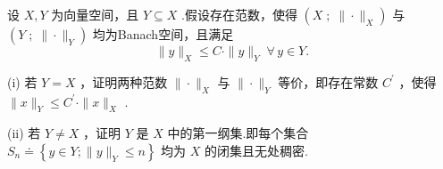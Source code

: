 \begin{rbhw}
设 $X,Y$ 为向量空间，且 $Y \subseteq  X$ .假设存在范数，使得 $\left( {X\;;\;\|  \cdot  {\| }_{X}}\right)$ 与 $\left( {Y\;;\;\|  \cdot  {\| }_{Y}}\right)$ 均为Banach空间，且满足
\[
\| y{\| }_{X} \leq  C \cdot  \| y{\| }_{Y}\;\forall\,y \in  Y.
\]

(i) 若 $Y = X$ ，证明两种范数 $\|  \cdot  {\| }_{X}$ 与 $\|  \cdot  {\| }_{Y}$ 等价，即存在常数 ${C}^{\prime }$ ，使得 $\| x{\| }_{Y} \leq  {C}^{\prime } \cdot  \| x{\| }_{X}$ .

(ii) 若 $Y \neq  X$ ，证明 $Y$ 是 $X$ 中的第一纲集.即每个集合 ${S}_{n} \doteq  \left\{  {y \in  Y;\| y{\| }_{Y} \leq  n}\right\}$ 均为 $X$ 的闭集且无处稠密.
\end{rbhw}
